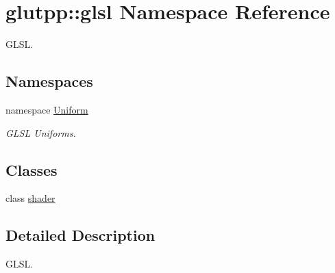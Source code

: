 \hypertarget{namespaceglutpp_1_1glsl}{\section{glutpp\-:\-:glsl \-Namespace \-Reference}
\label{namespaceglutpp_1_1glsl}
}


\-G\-L\-S\-L.  


\subsection*{\-Namespaces}
\begin{DoxyCompactItemize}
\item 
namespace \hyperlink{namespaceglutpp_1_1glsl_1_1Uniform}{\-Uniform}
\begin{DoxyCompactList}\small\item\em \-G\-L\-S\-L \-Uniforms. \end{DoxyCompactList}\end{DoxyCompactItemize}
\subsection*{\-Classes}
\begin{DoxyCompactItemize}
\item 
class \hyperlink{classglutpp_1_1glsl_1_1shader}{shader}
\end{DoxyCompactItemize}


\subsection{\-Detailed \-Description}
\-G\-L\-S\-L. 